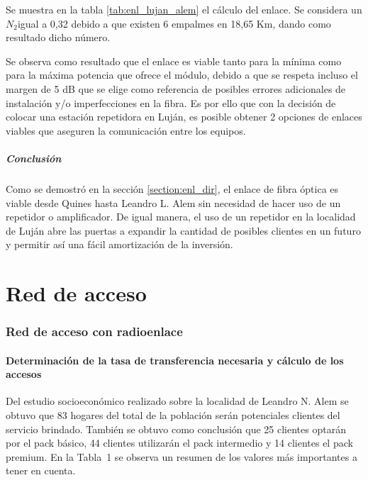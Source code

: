\documentclass[11pt,a4paper]{article}
\begin{document}
Se muestra en la tabla \ref{tab:enl_lujan_alem} el cálculo del enlace. Se considera un $N_2$igual a 0,32 debido a que existen 6 empalmes en 18,65 Km, dando como resultado dicho número. 


Se observa como resultado que el enlace es viable tanto para la mínima como para la máxima potencia que ofrece el módulo, debido a que se respeta incluso el margen de 5 dB que se elige como referencia de posibles errores adicionales de instalación y/o imperfecciones en la fibra. 
Es por ello que con la decisión de colocar una estación repetidora en Luján, es posible obtener 2 opciones de enlaces viables que aseguren la comunicación entre los equipos.

\subsubsection{Conclusión}

Como se demostró en la sección \ref{section:enl_dir}, el enlace de fibra óptica es viable desde Quines hasta Leandro L. Alem sin necesidad de hacer uso de un repetidor o amplificador. 
De igual manera, el uso de un repetidor en la localidad de Luján abre las puertas a expandir la cantidad de posibles clientes en un futuro y permitir así una fácil amortización de la inversión.


\clearpage
\part{Red de acceso}

\section{Red de acceso con radioenlace}

\subsection{Determinación de la tasa de transferencia necesaria y cálculo de los accesos}

Del estudio socioeconómico realizado sobre la localidad de Leandro N. Alem se obtuvo que 83 hogares del total de la población serán potenciales clientes del servicio brindado. 
También se obtuvo como conclusión que 25 clientes optarán por el pack básico, 44 clientes utilizarán el pack intermedio y 14 clientes el pack premium. 
En la Tabla~1 se observa un resumen de los valores más importantes a tener en cuenta.
\end{document}
